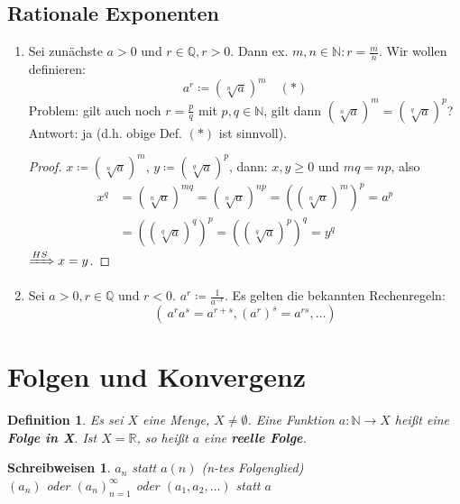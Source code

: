 \documentclass[titlepage,ngerman,a4paper,headsepline,DIV15,halfparskip*,14pt]{scrartcl}
\newcommand{\R}{\mathbb{R}}
\newcommand{\N}{\mathbb{N}}
\newcommand{\Q}{\mathbb{Q}}
\theoremstyle{dotless}
\newtheorem*{definition}{Definition}
\newtheorem*{schreibweisen}{Schreibweisen}
\begin{document}
\subsection*{Rationale Exponenten}
\begin{enumerate}
	\item Sei zunächste $a > 0$ und $r \in \Q, r > 0$. Dann ex. $m, n \in \N : r = \frac{m}{n}$. Wir wollen definieren:
		$$
			a^{r} \coloneqq \left( \sqrt[n]{a} \right)^{m} \quad (*)
		$$
		Problem: gilt auch noch $r = \frac{p}{q}$ mit $p, q \in \N$, gilt dann $\left( \sqrt[n]{a} \right)^{m} = \left( \sqrt[q]{a} \right)^{p}$? \\
		Antwort: ja (d.h. obige Def. $(*)$ ist sinnvoll).
		\begin{proof}
			$x \coloneqq \left( \sqrt[n]{a} \right)^{m}$, $y \coloneqq \left( \sqrt[q]{a} \right)^{p}$, dann: $x, y \geq 0$ und $mq = np$, also
			\begin{align*}
				x^{q} & = \left( \sqrt[n]{a} \right)^{mq} = \left( \sqrt[n]{a} \right)^{np} = \left(  \left( \sqrt[n]{a} \right)^{m}\right)^{p} = a^{p} \\
					  & = \left( \left( \sqrt[q]{a} \right)^{q}\right)^{p} = \left( \left( \sqrt[q]{a} \right)^{p}\right)^{q} = y^{q}
			\end{align*}
			$\xRightarrow[]{HS} x = y$.  
		\end{proof}
	\item Sei $a > 0, r \in \Q$ und $r < 0$. $a^{r} \coloneqq \frac{1}{a^{-r}}$. Es gelten die bekannten Rechenregeln:
		$$
			\left( ~ a^{r} a^{s} = a^{r + s}, \left( a^{r} \right)^{s} = a^{rs}, \dotsc \right)
		$$
\end{enumerate}


\newpage


\section{Folgen und Konvergenz}

 
\begin{definition}
	Es sei $X$ eine Menge, $X \neq \emptyset$. Eine Funktion $a \colon \N \to X$ hei{\ss}t eine \textbf{Folge in X}. Ist $X = \R$, so hei{\ss}t $a$ eine \textbf{reelle Folge}.
\end{definition}


\begin{schreibweisen}
$a_{n}$ statt $a(n)$ (n-tes Folgenglied) \\
$(a_{n})$ oder $(a_{n})_{n = 1}^{\infty}$ oder $(a_{1}, a_{2}, \dotsc)$ statt $a$
\end{schreibweisen}
\end{document}
